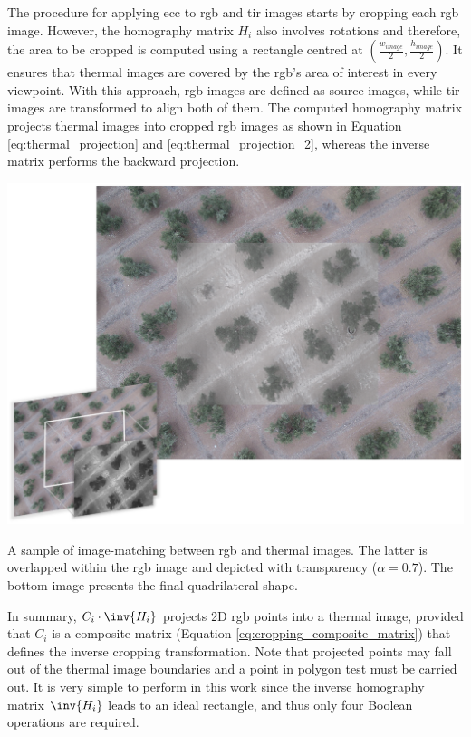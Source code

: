 The procedure for applying \acrshort{ecc} to \acrshort{rgb} and \acrshort{tir} images starts by cropping each \acrshort{rgb} image. However, the homography matrix $H_i$ also involves rotations and therefore, the area to be cropped is computed using a rectangle centred at $(\frac{w_{\textit{image}}}{2}, \frac{h_{\textit{image}}}{2})$. It ensures that thermal images are covered by the \acrshort{rgb}'s area of interest in every viewpoint. With this approach, \acrshort{rgb} images are defined as source images, while \acrshort{tir} images are transformed to align both of them. The computed homography matrix projects thermal images into cropped \acrshort{rgb} images as shown in Equation \ref{eq:thermal_projection} and \ref{eq:thermal_projection_2}, whereas the inverse matrix performs the backward projection. 

\begin{marginfigure}[.1cm]
	\includegraphics{figs/thermal_projection/thermal_ecc_registration.png}
	\caption{A sample of image-matching between \acrshort{rgb} and thermal images. The latter is overlapped within the \acrshort{rgb} image and depicted with transparency ($\alpha = 0.7$). The bottom image presents the final quadrilateral shape. }
	\label{fig:thermal_ecc_registration}
\end{marginfigure}
In summary, $C_{i} \cdot \inv{H_i}$ projects 2D \acrshort{rgb} points into a thermal image, provided that $C_{i}$ is a composite matrix (Equation \ref{eq:cropping_composite_matrix}) that defines the inverse cropping transformation. Note that projected points may fall out of the thermal image boundaries and a point in polygon test must be carried out. It is very simple to perform in this work since the inverse homography matrix $\inv{H_i}$ leads to an ideal rectangle, and thus only four Boolean operations are required.  
